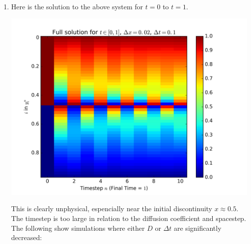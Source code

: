 \documentclass{article} %
\theoremstyle{plain}
\newcommand{\Dt}{\Delta t}
\numberwithin{equation}{section} %
\numberwithin{figure}{section} %
\numberwithin{table}{section} %
\begin{document}
\begin{enumerate}[\ \ (a)]
    \item Here is the solution to the above system for $t = 0$ to $t = 1$.

    \begin{minipage}{\textwidth}
        \includegraphics[width=\textwidth]{problem_3a.png}
    \end{minipage}
    This is clearly unphysical, espencially near the initial discontinuity $x \approx 0.5$.  The timestep is too large in relation to the diffusion coefficient and spacestep.  The following show simulations where either $D$ or $\Dt$ are significantly decreased:


\end{enumerate}
\end{document}

